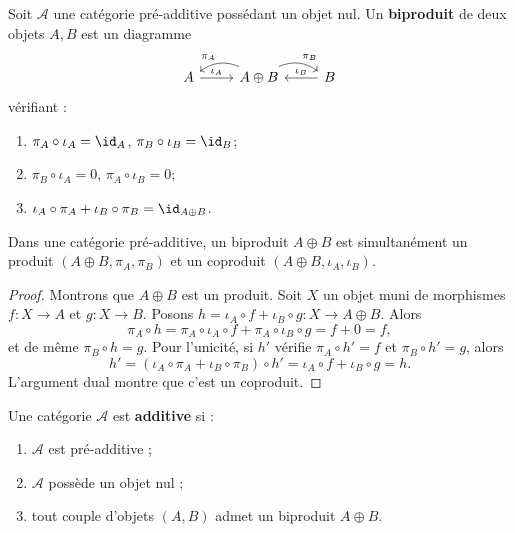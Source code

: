 \begin{definition}[Biproduit]\label{def:biproduct}
Soit $\mathcal{A}$ une catégorie pré-additive possédant un objet nul.
Un \textbf{biproduit} de deux objets $A, B$ est un
diagramme
\[
\begin{tikzcd}
A \arrow[r, "\iota_A"] & A \oplus B
  \arrow[l, bend right, "\pi_A"']
  \arrow[r, bend left, "\pi_B"]
& B \arrow[l, "\iota_B"']
\end{tikzcd}
\]
vérifiant :
\begin{enumerate}[label=(\alph*)]
\item $\pi_A \circ \iota_A = \id_A$, \quad $\pi_B \circ \iota_B = \id_B$;
\item $\pi_B \circ \iota_A = 0$, \quad $\pi_A \circ \iota_B = 0$;
\item $\iota_A \circ \pi_A + \iota_B \circ \pi_B = \id_{A \oplus B}$.
\end{enumerate}
\end{definition}

\begin{proposition}\label{prop:biproduct-product-coproduct}
Dans une catégorie pré-additive, un biproduit $A \oplus B$ est
simultanément un produit $(A \oplus B, \pi_A, \pi_B)$ et un
coproduit $(A \oplus B, \iota_A, \iota_B)$.
\end{proposition}

\begin{proof}
Montrons que $A \oplus B$ est un produit. Soit $X$ un objet muni de
morphismes $f \colon X \to A$ et $g \colon X \to B$. Posons
$h = \iota_A \circ f + \iota_B \circ g \colon X \to A \oplus B$.
Alors
\[
  \pi_A \circ h = \pi_A \circ \iota_A \circ f + \pi_A \circ \iota_B \circ g
  = f + 0 = f,
\]
et de même $\pi_B \circ h = g$. Pour l'unicité, si $h'$ vérifie
$\pi_A \circ h' = f$ et $\pi_B \circ h' = g$, alors
\[
  h' = (\iota_A \circ \pi_A + \iota_B \circ \pi_B) \circ h'
  = \iota_A \circ f + \iota_B \circ g = h.
\]
L'argument dual montre que c'est un coproduit.
\end{proof}

\begin{definition}\label{def:additive-cat}
Une catégorie $\mathcal{A}$ est \textbf{additive} si :
\begin{enumerate}[label=(\roman*)]
\item $\mathcal{A}$ est pré-additive ;
\item $\mathcal{A}$ possède un objet nul ;
\item tout couple d'objets $(A, B)$ admet un biproduit $A \oplus B$.
\end{enumerate}
\end{definition}

